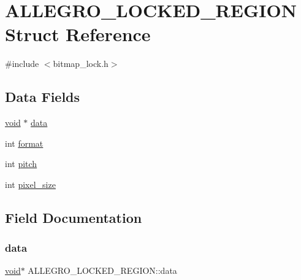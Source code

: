 \hypertarget{struct_a_l_l_e_g_r_o___l_o_c_k_e_d___r_e_g_i_o_n}{}\section{A\+L\+L\+E\+G\+R\+O\+\_\+\+L\+O\+C\+K\+E\+D\+\_\+\+R\+E\+G\+I\+ON Struct Reference}
\label{struct_a_l_l_e_g_r_o___l_o_c_k_e_d___r_e_g_i_o_n}


{\ttfamily \#include $<$bitmap\+\_\+lock.\+h$>$}

\subsection*{Data Fields}
\begin{DoxyCompactItemize}
\item 
\hyperlink{png_8h_ac9c84fa68bbad002983e35ce3663c686}{void} $\ast$ \hyperlink{struct_a_l_l_e_g_r_o___l_o_c_k_e_d___r_e_g_i_o_n_aaea0ad55012948f1ea8679729ffefd88}{data}
\item 
int \hyperlink{struct_a_l_l_e_g_r_o___l_o_c_k_e_d___r_e_g_i_o_n_a55553ea1901e2a005375d1ca27f91469}{format}
\item 
int \hyperlink{struct_a_l_l_e_g_r_o___l_o_c_k_e_d___r_e_g_i_o_n_ab9f4f0a5ad422212ea7c702b50c189f4}{pitch}
\item 
int \hyperlink{struct_a_l_l_e_g_r_o___l_o_c_k_e_d___r_e_g_i_o_n_a5bd43d29a4c3a38f17f667fa11364caf}{pixel\+\_\+size}
\end{DoxyCompactItemize}


\subsection{Field Documentation}
\mbox{\label{struct_a_l_l_e_g_r_o___l_o_c_k_e_d___r_e_g_i_o_n_aaea0ad55012948f1ea8679729ffefd88}} 
\subsubsection{\texorpdfstring{data}{data}}
{\footnotesize\ttfamily \hyperlink{png_8h_ac9c84fa68bbad002983e35ce3663c686}{void}$\ast$ A\+L\+L\+E\+G\+R\+O\+\_\+\+L\+O\+C\+K\+E\+D\+\_\+\+R\+E\+G\+I\+O\+N\+::data}

